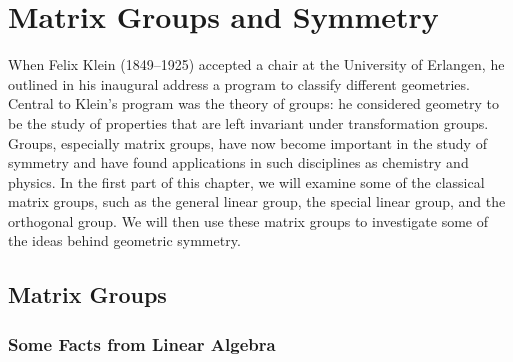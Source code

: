 \chapter{Matrix Groups and Symmetry}\label{matrix}

When Felix Klein (1849--1925) accepted a chair at
the University of Erlangen, he outlined in his inaugural address a
program to classify different geometries. Central to Klein's
program was the theory of groups: he considered geometry to be the
study of properties that are left invariant under transformation
groups. Groups, especially matrix groups, have now become important in
the study of symmetry and have found applications in such disciplines
as chemistry and physics. In the first part of this chapter, we will
examine some of the classical matrix groups, such as the general linear
group, the special linear group, and the orthogonal group. We will
then use these matrix groups to investigate some of the ideas behind
geometric symmetry.  


\section{Matrix Groups}

\subsection*{Some Facts from Linear Algebra}
 
